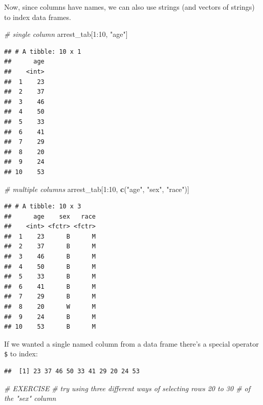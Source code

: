 \documentclass[]{article}
\newenvironment{Shaded}{\begin{snugshade}}{\end{snugshade}}
\newcommand{\KeywordTok}[1]{\textcolor[rgb]{0.13,0.29,0.53}{\textbf{{#1}}}}
\newcommand{\DecValTok}[1]{\textcolor[rgb]{0.00,0.00,0.81}{{#1}}}
\newcommand{\StringTok}[1]{\textcolor[rgb]{0.31,0.60,0.02}{{#1}}}
\newcommand{\CommentTok}[1]{\textcolor[rgb]{0.56,0.35,0.01}{\textit{{#1}}}}
\newcommand{\NormalTok}[1]{{#1}}
\theoremstyle{definition}
\theoremstyle{definition}
\theoremstyle{remark}
\begin{document}
Now, since columns have names, we can also use strings (and vectors of
strings) to index data frames.

\begin{Shaded}
\begin{Highlighting}[]
\CommentTok{# single column}
\NormalTok{arrest_tab[}\DecValTok{1}\NormalTok{:}\DecValTok{10}\NormalTok{, }\StringTok{"age"}\NormalTok{]}
\end{Highlighting}
\end{Shaded}

\begin{verbatim}
## # A tibble: 10 x 1
##      age
##    <int>
##  1    23
##  2    37
##  3    46
##  4    50
##  5    33
##  6    41
##  7    29
##  8    20
##  9    24
## 10    53
\end{verbatim}

\begin{Shaded}
\begin{Highlighting}[]
\CommentTok{# multiple columns}
\NormalTok{arrest_tab[}\DecValTok{1}\NormalTok{:}\DecValTok{10}\NormalTok{, }\KeywordTok{c}\NormalTok{(}\StringTok{"age"}\NormalTok{, }\StringTok{"sex"}\NormalTok{, }\StringTok{"race"}\NormalTok{)]}
\end{Highlighting}
\end{Shaded}

\begin{verbatim}
## # A tibble: 10 x 3
##      age    sex   race
##    <int> <fctr> <fctr>
##  1    23      B      M
##  2    37      B      M
##  3    46      B      M
##  4    50      B      M
##  5    33      B      M
##  6    41      B      M
##  7    29      B      M
##  8    20      W      M
##  9    24      B      M
## 10    53      B      M
\end{verbatim}

If we wanted a single named column from a data frame there's a special
operator \texttt{\$} to index:

\begin{Shaded}
\end{Shaded}

\begin{verbatim}
##  [1] 23 37 46 50 33 41 29 20 24 53
\end{verbatim}

\begin{Shaded}
\begin{Highlighting}[]
\CommentTok{# EXERCISE}
\CommentTok{# try using three different ways of selecting rows 20 to 30 # of the "sex" column}
\end{Highlighting}
\end{Shaded}
\end{document}
